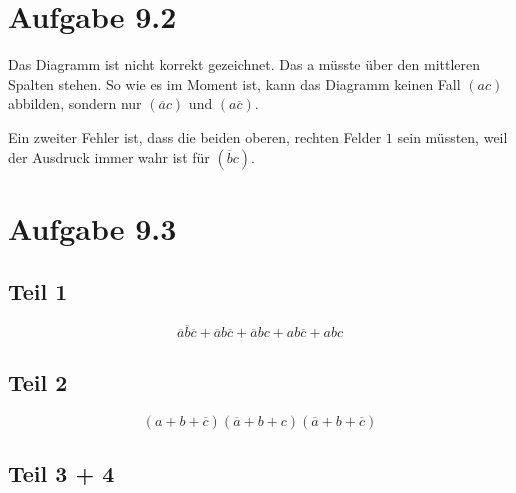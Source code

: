 \documentclass[10pt,a4paper]{article}
\begin{document}
\section*{Aufgabe 9.2}

Das Diagramm ist nicht korrekt gezeichnet.
Das a müsste über den mittleren Spalten stehen.
So wie es im Moment ist, kann das Diagramm keinen Fall $(ac)$ abbilden, sondern nur $(\overline{a}c)$ und $(a\overline{c})$.

Ein zweiter Fehler ist, dass die beiden oberen, rechten Felder $1$ sein müssten, weil der Ausdruck immer wahr ist für $(\overline{b}c)$.

\section*{Aufgabe 9.3}

\subsection*{Teil 1}

\begin{equation}
\overline{a}\overline{b}\overline{c} + \overline{a}b\overline{c} + \overline{a}bc + ab\overline{c} + abc
\end{equation}

\subsection*{Teil 2}

\begin{equation}
(a + b + \overline{c})(\overline{a} + b + c)(\overline{a} + b + \overline{c})
\end{equation}

\subsection*{Teil 3 + 4}
\end{document}
